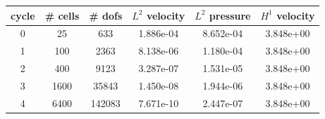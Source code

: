 \documentclass[10pt]{report}
\begin{document}
\begin{table}[H]
\begin{center}
\begin{tabular}{|c|c|c|c|c|c|} \hline
cycle & \# cells & \# dofs & $L^2$ velocity & $L^2$ pressure & $H^1$ velocity\\ \hline
0 & 25 & 633 & 1.886e-04 & 8.652e-04 & 3.848e+00\\ \hline
1 & 100 & 2363 & 8.138e-06 & 1.180e-04 & 3.848e+00\\ \hline
2 & 400 & 9123 & 3.287e-07 & 1.531e-05 & 3.848e+00\\ \hline
3 & 1600 & 35843 & 1.450e-08 & 1.944e-06 & 3.848e+00\\ \hline
4 & 6400 & 142083 & 7.671e-10 & 2.447e-07 & 3.848e+00\\ \hline
\end{tabular}
\end{center}
\end{table}
\end{document}

